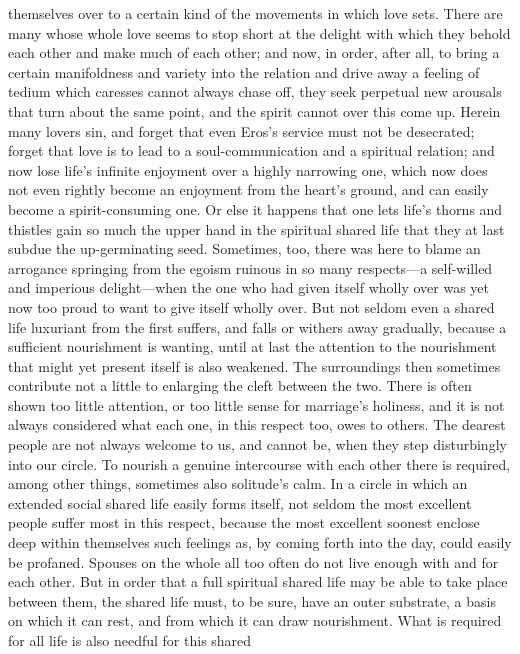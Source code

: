 \documentclass[12pt,a4paper]{book}
\begin{document}
themselves over to a certain kind of the movements in which love sets.
There are many whose whole love seems to stop short at the delight with
which they behold each other and make much of each other; and now, in order,
after all, to bring a certain manifoldness and variety into the relation
and drive away a feeling of tedium which caresses cannot always chase off,
they seek perpetual new arousals that turn about the same point, and the
spirit cannot over this come up. Herein many lovers sin, and forget that
even Eros's service must not be desecrated; forget that love is to lead to
a soul-communication and a spiritual relation; and now lose life's infinite
enjoyment over a highly narrowing one, which now does not even rightly
become an enjoyment from the heart's ground, and can easily become a
spirit-consuming one. Or else it happens that one lets life's thorns and
thistles gain so much the upper hand in the spiritual shared life that they
at last subdue the up-germinating seed. Sometimes, too, there was here to
blame an arrogance springing from the egoism ruinous in so many
respects---a self-willed and imperious delight---when the one who had given
itself wholly over was yet now too proud to want to give itself wholly
over. But not seldom even a shared life luxuriant from the first suffers,
and falls or withers away gradually, because a sufficient nourishment is
wanting, until at last the attention to the nourishment that might yet
present itself is also weakened. The surroundings then sometimes contribute
not a little to enlarging the cleft between the two. There is often shown
too little attention, or too little sense for marriage's holiness, and it
is not always considered what each one, in this respect too, owes to
others. The dearest people are not always welcome to us, and cannot be,
when they step disturbingly into our circle. To nourish a genuine
intercourse with each other there is required, among other things,
sometimes also solitude's calm. In a circle in which an extended social
shared life easily forms itself, not seldom the most excellent people
suffer most in this respect, because the most excellent soonest enclose
deep within themselves such feelings as, by coming forth into the day,
could easily be profaned.
Spouses on the whole all too often do not live enough with and for each
other. But in order that a full spiritual shared life may be able to take
place between them, the shared life must, to be sure, have an outer
substrate, a basis on which it can rest, and from which it can draw
nourishment. What is required for all life is also needful for this shared
\end{document}
